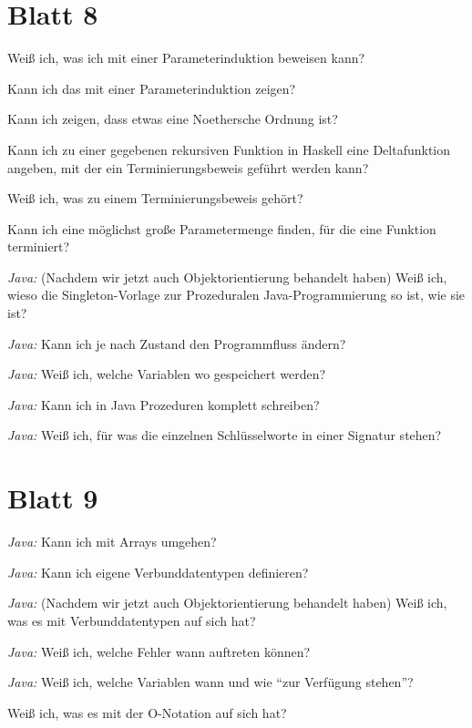 \documentclass{article}
\newcommand*{\thecheckbox}{\hss[\hss]}
\newenvironment*{checklist} 
{\list{}{\itemsep -2pt 
\renewcommand*{\makelabel}[1]{\thecheckbox}}} 
{\endlist}
\begin{document}
\section{Blatt 8}

\begin{checklist}
  \item Weiß ich, was ich mit einer Parameterinduktion beweisen kann?
  \item Kann ich das mit einer Parameterinduktion zeigen?
  \item Kann ich zeigen, dass etwas eine Noethersche Ordnung ist?
  \item Kann ich zu einer gegebenen rekursiven Funktion in Haskell eine Deltafunktion angeben, mit der ein Terminierungsbeweis geführt werden kann?
  \item Weiß ich, was zu einem Terminierungsbeweis gehört?
  \item Kann ich eine möglichst große Parametermenge finden, für die eine Funktion terminiert?
  \item \emph{Java:} (Nachdem wir jetzt auch Objektorientierung behandelt haben) Weiß ich, wieso die Singleton-Vorlage zur Prozeduralen Java-Programmierung so ist, wie sie ist?
  \item \emph{Java:} Kann ich je nach Zustand den Programmfluss ändern?
  \item \emph{Java:} Weiß ich, welche Variablen wo gespeichert werden?
  \item \emph{Java:} Kann ich in Java Prozeduren komplett schreiben?
  \item \emph{Java:} Weiß ich, für was die einzelnen Schlüsselworte in einer Signatur stehen?
\end{checklist}

\section{Blatt 9}

\begin{checklist}
  \item \emph{Java:} Kann ich mit Arrays umgehen?
  \item \emph{Java:} Kann ich eigene Verbunddatentypen definieren?
  \item \emph{Java:} (Nachdem wir jetzt auch Objektorientierung behandelt haben) Weiß ich, was es mit Verbunddatentypen auf sich hat?
  \item \emph{Java:} Weiß ich, welche Fehler wann auftreten können?
  \item \emph{Java:} Weiß ich, welche Variablen wann und wie "`zur Verfügung stehen"'?
  \item Weiß ich, was es mit der O-Notation auf sich hat?
\end{checklist}
\end{document}
